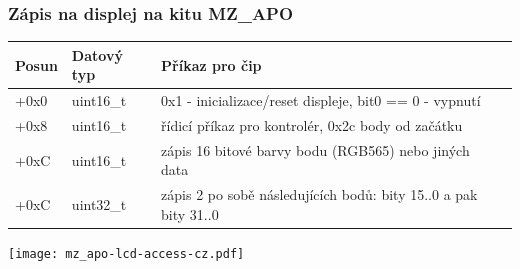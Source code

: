 \documentclass{beamer}
\begin{document}
\begin{frame}
\frametitle{Zápis na displej na kitu MZ\_APO}

\begin{tabular}{|l|l|l|l|} \hline
Posun & \footnotesize{Datový typ} & Příkaz pro čip \\\hline
+0x0 & \footnotesize{uint16\_t} & \footnotesize{0x1 - inicializace/reset displeje, bit0 == 0 - vypnutí} \\\hline
+0x8 & \footnotesize{uint16\_t} & \footnotesize{řídicí příkaz pro kontrolér, 0x2c body od začátku} \\\hline
+0xC & \footnotesize{uint16\_t} & \footnotesize{zápis 16 bitové barvy bodu (RGB565) nebo jiných data} \\\hline
+0xC & \footnotesize{uint32\_t} & \footnotesize{zápis 2 po sobě následujících bodů: bity 15..0 a pak bity 31..0} \\\hline
\end{tabular}

\vspace{5mm}

\texttt{[image: mz\_apo-lcd-access-cz.pdf]}

\end{frame}
\end{document}
